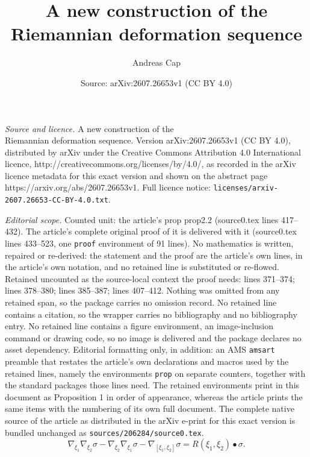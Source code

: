 \documentclass[10pt,a4paper]{amsart}
\title{A new construction of the\\ Riemannian deformation sequence}
\author{Andreas Cap}
\date{Source: arXiv:2607.26653v1 (CC BY 4.0)}
\newcommand{\si}{\sigma}
\begin{document}
\maketitle

\noindent\emph{Source and licence.} A new construction of the\\ Riemannian deformation sequence. Version arXiv:2607.26653v1 (CC BY 4.0), distributed by arXiv under the Creative Commons Attribution 4.0 International licence, http://creativecommons.org/licenses/by/4.0/, as recorded in the arXiv licence metadata for this exact version and shown on the abstract page https://arxiv.org/abs/2607.26653v1. Full licence notice: \texttt{licenses/arxiv-2607.26653-CC-BY-4.0.txt}.\par\smallskip

\noindent\textit{Editorial scope.} Counted unit: the article's prop prop2.2 (source0.tex lines 417--432). The article's complete original proof of it is delivered with it (source0.tex lines 433--523, one \texttt{proof} environment of 91 lines). No mathematics is written, repaired or re-derived: the statement and the proof are the article's own lines, in the article's own notation, and no retained line is substituted or re-flowed.  Retained uncounted as the source-local context the proof needs: lines 371--374; lines 378--380; lines 385--387; lines 407--412.  Nothing was omitted from any retained span, so the package carries no omission record.  No retained line contains a citation, so the wrapper carries no bibliography and no bibliography entry.  No retained line contains a figure environment, an image-inclusion command or drawing code, so no image is delivered and the package declares no asset dependency.  Editorial formatting only, in addition: an AMS \texttt{amsart} preamble that restates the article's own declarations and macros used by the retained lines, namely the environments \texttt{prop} on separate counters, together with the standard packages those lines need.  The retained environments print in this document as Proposition 1 in order of appearance, whereas the article prints the same items with the numbering of its own full document.  The complete native source of the article as distributed in the arXiv e-print for this exact version is bundled unchanged as \texttt{sources/206284/source0.tex}.
\begin{equation}\label{curv-W}
  \nabla_{\xi_1}\nabla_{\xi_2}\si-\nabla_{\xi_2}\nabla_{\xi_1}\si-\nabla_{[\xi_1,\xi_2]}\si=
  R(\xi_1,\xi_2)\bullet\si.
\end{equation}
\end{document}
